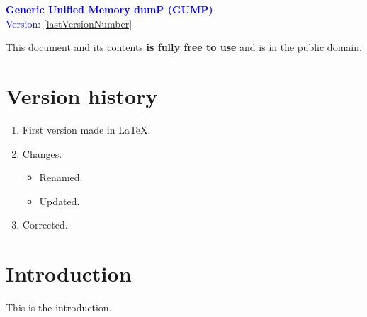 \documentclass[11pt]{article}
\begin{document}
\begin{titlepage}
    \begin{center}
        \vspace{0.3 cm}
        \textcolor{blue}{{\Huge \textbf{Generic Unified Memory dumP (GUMP)}}} \\
        \vspace{0.4 cm}
        \textcolor{blue}{{\large Version: \ref{lastVersionNumber}}} \\
        \vspace{1.6 cm}
    \end{center}

    \begin{tcolorbox}[width=\textwidth, colframe={blue}, title=Classification: Public domain]
        This document and its contents \textbf{is fully free to use} and is in the public domain.\\
    \end{tcolorbox}

    \thispagestyle{empty}
    \hypersetup{pageanchor=false}
\end{titlepage}
\newpage

\newpage
{}

\tableofcontents
\newpage

\section{Version history}
\begin{enumerate}[label=\textbf{\arabic*}, ref=\arabic*]
    \setcounter{enumi}{0}
    \item First version made in \LaTeX.
    \item Changes.
    \begin{itemize}
        \item Renamed.
        \item Updated.
    \end{itemize}
    \item Corrected.
    \label{lastVersionNumber}
\end{enumerate}
\newpage

\section{Introduction}
This is the introduction.
\newpage

\newpage
\end{document}
